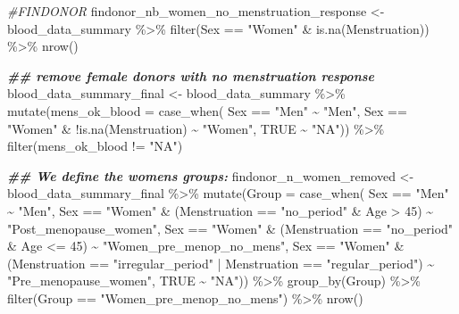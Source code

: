 \documentclass[
]{article}
\newenvironment{Shaded}{\begin{snugshade}}{\end{snugshade}}
\newcommand{\AttributeTok}[1]{\textcolor[rgb]{0.77,0.63,0.00}{#1}}
\newcommand{\CommentTok}[1]{\textcolor[rgb]{0.56,0.35,0.01}{\textit{#1}}}
\newcommand{\ConstantTok}[1]{\textcolor[rgb]{0.00,0.00,0.00}{#1}}
\newcommand{\DecValTok}[1]{\textcolor[rgb]{0.00,0.00,0.81}{#1}}
\newcommand{\DocumentationTok}[1]{\textcolor[rgb]{0.56,0.35,0.01}{\textbf{\textit{#1}}}}
\newcommand{\FunctionTok}[1]{\textcolor[rgb]{0.00,0.00,0.00}{#1}}
\newcommand{\NormalTok}[1]{#1}
\newcommand{\OtherTok}[1]{\textcolor[rgb]{0.56,0.35,0.01}{#1}}
\newcommand{\SpecialCharTok}[1]{\textcolor[rgb]{0.00,0.00,0.00}{#1}}
\newcommand{\StringTok}[1]{\textcolor[rgb]{0.31,0.60,0.02}{#1}}
\begin{document}
\begin{Shaded}
\begin{Highlighting}[]
\CommentTok{\#FINDONOR}
\NormalTok{findonor\_nb\_women\_no\_menstruation\_response }\OtherTok{\textless{}{-}}\NormalTok{ blood\_data\_summary }\SpecialCharTok{\%\textgreater{}\%} \FunctionTok{filter}\NormalTok{(Sex }\SpecialCharTok{==} \StringTok{"Women"} \SpecialCharTok{\&} \FunctionTok{is.na}\NormalTok{(Menstruation)) }\SpecialCharTok{\%\textgreater{}\%} \FunctionTok{nrow}\NormalTok{()}

\DocumentationTok{\#\# remove female donors with no menstruation response}
\NormalTok{blood\_data\_summary\_final }\OtherTok{\textless{}{-}}\NormalTok{ blood\_data\_summary }\SpecialCharTok{\%\textgreater{}\%} 
  \FunctionTok{mutate}\NormalTok{(}\AttributeTok{mens\_ok\_blood =} \FunctionTok{case\_when}\NormalTok{(}
\NormalTok{    Sex }\SpecialCharTok{==} \StringTok{"Men"} \SpecialCharTok{\textasciitilde{}} \StringTok{"Men"}\NormalTok{, }
\NormalTok{    Sex }\SpecialCharTok{==} \StringTok{"Women"} \SpecialCharTok{\&} \SpecialCharTok{!}\FunctionTok{is.na}\NormalTok{(Menstruation)  }\SpecialCharTok{\textasciitilde{}} \StringTok{"Women"}\NormalTok{,}
    \ConstantTok{TRUE} \SpecialCharTok{\textasciitilde{}} \StringTok{"NA"}\NormalTok{)) }\SpecialCharTok{\%\textgreater{}\%} 
  \FunctionTok{filter}\NormalTok{(mens\_ok\_blood }\SpecialCharTok{!=} \StringTok{"NA"}\NormalTok{) }

\DocumentationTok{\#\# We define the women\textquotesingle{}s groups: }
\NormalTok{findonor\_n\_women\_removed }\OtherTok{\textless{}{-}}\NormalTok{ blood\_data\_summary\_final }\SpecialCharTok{\%\textgreater{}\%} 
  \FunctionTok{mutate}\NormalTok{(}\AttributeTok{Group =} \FunctionTok{case\_when}\NormalTok{(}
\NormalTok{    Sex }\SpecialCharTok{==} \StringTok{"Men"} \SpecialCharTok{\textasciitilde{}} \StringTok{"Men"}\NormalTok{, }
\NormalTok{    Sex }\SpecialCharTok{==} \StringTok{"Women"} \SpecialCharTok{\&}\NormalTok{ (Menstruation }\SpecialCharTok{==} \StringTok{"no\_period"} \SpecialCharTok{\&}\NormalTok{ Age }\SpecialCharTok{\textgreater{}} \DecValTok{45}\NormalTok{) }\SpecialCharTok{\textasciitilde{}} \StringTok{"Post\_menopause\_women"}\NormalTok{,}
\NormalTok{    Sex }\SpecialCharTok{==} \StringTok{"Women"} \SpecialCharTok{\&}\NormalTok{ (Menstruation }\SpecialCharTok{==} \StringTok{"no\_period"} \SpecialCharTok{\&}\NormalTok{ Age }\SpecialCharTok{\textless{}=} \DecValTok{45}\NormalTok{) }\SpecialCharTok{\textasciitilde{}} \StringTok{"Women\_pre\_menop\_no\_mens"}\NormalTok{,}
\NormalTok{    Sex }\SpecialCharTok{==} \StringTok{"Women"} \SpecialCharTok{\&}\NormalTok{ (Menstruation }\SpecialCharTok{==} \StringTok{"irregular\_period"} \SpecialCharTok{|}\NormalTok{ Menstruation }\SpecialCharTok{==} \StringTok{"regular\_period"}\NormalTok{) }\SpecialCharTok{\textasciitilde{}} \StringTok{"Pre\_menopause\_women"}\NormalTok{,}
    \ConstantTok{TRUE} \SpecialCharTok{\textasciitilde{}} \StringTok{"NA"}\NormalTok{)) }\SpecialCharTok{\%\textgreater{}\%} 
  \FunctionTok{group\_by}\NormalTok{(Group) }\SpecialCharTok{\%\textgreater{}\%} 
  \FunctionTok{filter}\NormalTok{(Group }\SpecialCharTok{==}  \StringTok{"Women\_pre\_menop\_no\_mens"}\NormalTok{) }\SpecialCharTok{\%\textgreater{}\%} 
  \FunctionTok{nrow}\NormalTok{()}



\end{Highlighting}
\end{Shaded}
\end{document}
